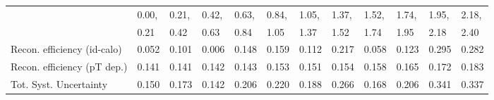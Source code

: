 \begin{tabular}{l|p{0.6cm}p{0.6cm}p{0.6cm}p{0.6cm}p{0.6cm}p{0.6cm}p{0.6cm}p{0.6cm}p{0.6cm}p{0.6cm}p{0.6cm}}
\hline
   & 0.00, & 0.21, & 0.42, & 0.63, & 0.84, & 1.05, & 1.37, & 1.52, & 1.74, & 1.95, & 2.18,  \\ 
   & 0.21 & 0.42 & 0.63 & 0.84 & 1.05 & 1.37 & 1.52 & 1.74 & 1.95 & 2.18 & 2.40  \\ 
\hline
Recon. efficiency (id-calo)              & 0.052 & 0.101 & 0.006 & 0.148 & 0.159 & 0.112 & 0.217 & 0.058 & 0.123 & 0.295 & 0.282 \\
\hline
Recon. efficiency (pT dep.)              & 0.141 & 0.141 & 0.142 & 0.143 & 0.153 & 0.151 & 0.154 & 0.158 & 0.165 & 0.172 & 0.183 \\
\hline
Tot. Syst. Uncertainty                   & 0.150 & 0.173 & 0.142 & 0.206 & 0.220 & 0.188 & 0.266 & 0.168 & 0.206 & 0.341 & 0.337 \\
\hline
\end{tabular}
